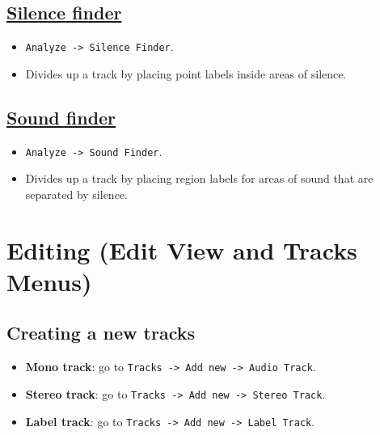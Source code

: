 \section{\href{http://manual.audacityteam.org/o/man/silence_finder_and_sound_finder.html\#silence}{Silence finder}}
\begin{itemize}
\item \verb|Analyze -> Silence Finder|.
\item Divides up a track by placing point labels inside areas of silence.
\end{itemize}

\section{\href{http://manual.audacityteam.org/o/man/silence_finder_and_sound_finder.html\#sound}{Sound finder}}
\begin{itemize}
\item \verb|Analyze -> Sound Finder|.
\item Divides up a track by placing region labels for areas of sound
  that are separated by silence.
\end{itemize}

\chapter{Editing (Edit View and Tracks Menus)}

\section{Creating a new tracks}
\begin{itemize}
\item \textbf{Mono track}: go to %
  \verb|Tracks -> Add new -> Audio Track|.
\item \textbf{Stereo track}: go to %
  \verb|Tracks -> Add new -> Stereo Track|.
\item \textbf{Label track}: go to %
  \verb|Tracks -> Add new -> Label Track|.
\end{itemize}

